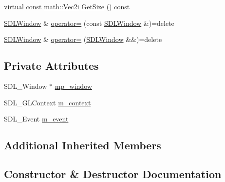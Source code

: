 \begin{DoxyCompactItemize}
\item 
virtual const \mbox{\hyperlink{namespacepad_1_1math_a808a631a6bccd994f9589d7fb86bad41}{math\+::\+Vec2i}} \mbox{\hyperlink{classpad_1_1sys_1_1_s_d_l_window_a4b39d8767776e1fe6f613ad3fe7d7b29}{Get\+Size}} () const
\item 
\mbox{\hyperlink{classpad_1_1sys_1_1_s_d_l_window}{S\+D\+L\+Window}} \& \mbox{\hyperlink{classpad_1_1sys_1_1_s_d_l_window_a16ec17984ff879debe4ddce2784ec858}{operator=}} (const \mbox{\hyperlink{classpad_1_1sys_1_1_s_d_l_window}{S\+D\+L\+Window}} \&)=delete
\item 
\mbox{\hyperlink{classpad_1_1sys_1_1_s_d_l_window}{S\+D\+L\+Window}} \& \mbox{\hyperlink{classpad_1_1sys_1_1_s_d_l_window_addbf3af44214f1bc0ece277fedac35cd}{operator=}} (\mbox{\hyperlink{classpad_1_1sys_1_1_s_d_l_window}{S\+D\+L\+Window}} \&\&)=delete
\end{DoxyCompactItemize}
\subsection*{Private Attributes}
\begin{DoxyCompactItemize}
\item 
S\+D\+L\+\_\+\+Window $\ast$ \mbox{\hyperlink{classpad_1_1sys_1_1_s_d_l_window_a9ca166466e5306a205a3448d4199ec4f}{mp\+\_\+window}}
\item 
S\+D\+L\+\_\+\+G\+L\+Context \mbox{\hyperlink{classpad_1_1sys_1_1_s_d_l_window_a96971350b1dc47be7cd0ef7776ae095f}{m\+\_\+context}}
\item 
S\+D\+L\+\_\+\+Event \mbox{\hyperlink{classpad_1_1sys_1_1_s_d_l_window_a98bb97af76c295e146a2237147150545}{m\+\_\+event}}
\end{DoxyCompactItemize}
\subsection*{Additional Inherited Members}


\subsection{Constructor \& Destructor Documentation}
\mbox{\label{classpad_1_1sys_1_1_s_d_l_window_a545ce6b68cf03a84e5602e073f2edf99}} 

